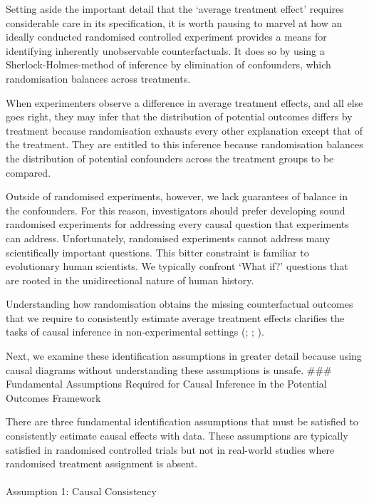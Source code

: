 \documentclass[
  single column]{article}
\makeatletter
\let\oldparagraph\paragraph
\renewcommand{\paragraph}{
    \@ifstar
      \xxxParagraphStar
      \xxxParagraphNoStar
  }
\newcommand{\xxxParagraphStar}[1]{\oldparagraph*{#1}\mbox{}}
\newcommand{\xxxParagraphNoStar}[1]{\oldparagraph{#1}\mbox{}}
\makeatother
\begin{document}
Setting aside the important detail that the `average treatment effect'
requires considerable care in its specification, it is worth pausing to
marvel at how an ideally conducted randomised controlled experiment
provides a means for identifying inherently unobservable
counterfactuals. It does so by using a Sherlock-Holmes-method of
inference by elimination of confounders, which randomisation balances
across treatments.

When experimenters observe a difference in average treatment effects,
and all else goes right, they may infer that the distribution of
potential outcomes differs by treatment because randomisation exhausts
every other explanation except that of the treatment. They are entitled
to this inference because randomisation balances the distribution of
potential confounders across the treatment groups to be compared.

Outside of randomised experiments, however, we lack guarantees of
balance in the confounders. For this reason, investigators should prefer
developing sound randomised experiments for addressing every causal
question that experiments can address. Unfortunately, randomised
experiments cannot address many scientifically important questions. This
bitter constraint is familiar to evolutionary human scientists. We
typically confront `What if?' questions that are rooted in the
unidirectional nature of human history.

Understanding how randomisation obtains the missing counterfactual
outcomes that we require to consistently estimate average treatment
effects clarifies the tasks of causal inference in non-experimental
settings (;
;
).

Next, we examine these identification assumptions in greater detail
because using causal diagrams without understanding these assumptions is
unsafe. \#\#\# Fundamental Assumptions Required for Causal Inference in
the Potential Outcomes Framework

There are three fundamental identification assumptions that must be
satisfied to consistently estimate causal effects with data. These
assumptions are typically satisfied in randomised controlled trials but
not in real-world studies where randomised treatment assignment is
absent.

\paragraph{Assumption 1: Causal
Consistency}\label{assumption-1-causal-consistency}
\end{document}
